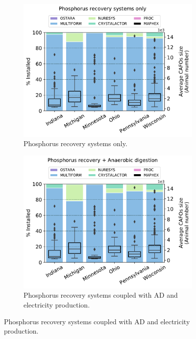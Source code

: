 \begin{refsection}[referencesCh4]
\begin{figure}[h]
	\begin{subfigure}[t]{0.49\linewidth}
		\includegraphics[width=\linewidth]{gfx/Chapter4/TechsDistribution_Pcredits22_REC0.pdf} 
		\caption{Phosphorus recovery systems only.}
		\label{fig:PTechs_Distribution_NoAD}
	\end{subfigure}
	\quad
	\begin{subfigure}[t]{0.49\linewidth}
		\includegraphics[width=\linewidth]{gfx/Chapter4/TechsDistribution_Pcredits22_REC60.pdf}
		\caption{Phosphorus recovery systems coupled with AD and electricity production.}
		\label{fig:PTechs_Distribution_AD}
	\end{subfigure}
	

\end{figure}
\end{refsection}
